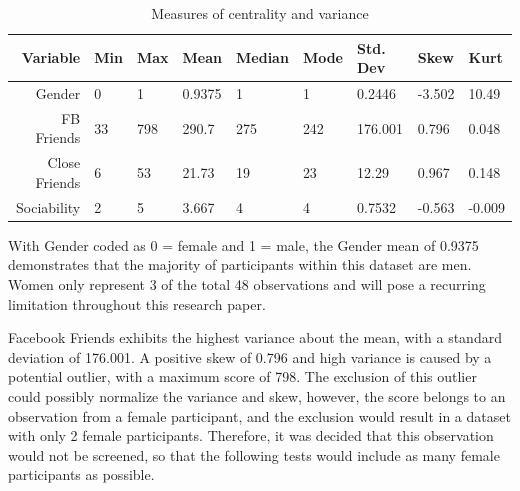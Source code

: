 \begin{table}[H]
\centering
\caption{Measures of centrality and variance}
\begin{tabular}{r|l|l|l|l|l|l|l|l}
Variable      & Min & Max & Mean   & Median & Mode & Std. Dev & Skew   & Kurt      \\ \hline
Gender        & 0   & 1   & 0.9375 & 1      & 1    & 0.2446   & -3.502 & 10.49     \\ \hline
FB Friends    & 33  & 798 & 290.7  & 275    & 242  & 176.001  & 0.796  & 0.048   \\ \hline
Close Friends & 6   & 53  & 21.73  & 19     & 23   & 12.29    & 0.967  & 0.148    \\ \hline
Sociability   & 2   & 5   & 3.667  & 4      & 4    & 0.7532   & -0.563 & -0.009 \\ \hline
\end{tabular}
\end{table}



With Gender coded as 0 = female and 1 = male, the Gender mean of 0.9375 demonstrates that the majority of participants within this dataset are men. Women only represent 3 of the total 48 observations and will pose a recurring limitation throughout this research paper.


Facebook Friends exhibits the highest variance about the mean, with a standard deviation of 176.001. A positive skew of 0.796 and high variance is caused by a potential outlier, with a maximum score of 798. The exclusion of this outlier could possibly normalize the variance and skew, however, the score belongs to an observation from a female participant, and the exclusion would result in a dataset with only 2 female participants. Therefore, it was decided that this observation would not be screened, so that the following tests would include as many female participants as possible.

